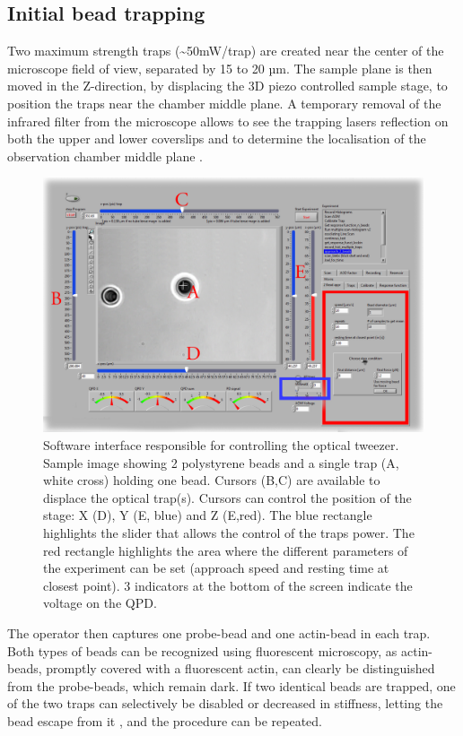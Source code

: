 \documentclass[A4paperpaper,11pt,english]{sphinxmanual}
\begin{document}
\subsection{Initial bead trapping}
\label{index-latex:initial-bead-trapping}
Two maximum strength traps (\textasciitilde{}50mW/trap) are created near the center of the
microscope field of view, separated by 15 to 20 µm. The sample plane is then moved in
the Z-direction, by displacing the 3D piezo controlled sample stage, to position the traps
near the chamber middle plane. A temporary removal of the infrared filter
from the microscope allows to see the trapping lasers reflection on both the
upper and lower coverslips and to determine the localisation of the observation chamber middle plane
.
\begin{figure}[htbp]
\centering
\capstart

\includegraphics[width=0.900\linewidth]{frontend.png}
\caption{Software interface responsible for controlling the optical tweezer.  Sample
image showing 2 polystyrene beads and a single trap (A, white cross) holding one bead.
Cursors (B,C) are available to displace the optical trap(s).  Cursors can
control the position of the stage: X (D), Y (E, blue) and Z (E,red).
The blue rectangle highlights the slider that allows the control of the traps power.  The red
rectangle highlights the area where the different parameters of the experiment
can be set (approach speed and resting time at closest point). 3 indicators at
the bottom of the screen indicate the voltage on the QPD.}\label{index-latex:fig-frontend}\end{figure}

The operator then captures one probe-bead and one actin-bead in each
trap.  Both types of beads can be recognized using fluorescent microscopy, as
actin-beads, promptly covered with a fluorescent actin,
can clearly be distinguished from the probe-beads, which remain dark.
If two identical beads are trapped, one of the two traps can selectively
be disabled or decreased in stiffness, letting the bead escape from it ,
and the procedure can be repeated.
\end{document}
